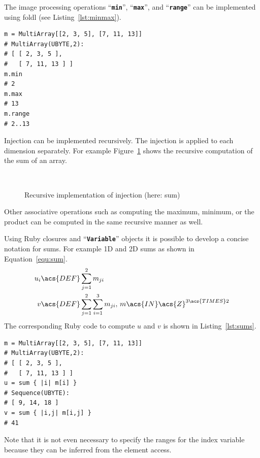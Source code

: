 \documentclass[12pt,a4paper,oneside,openright]{book}
\newcommand{\Eg}{For example }
\newcommand{\equ}[1]{Equation~\ref{equ:#1}}
\newcommand{\fig}[1]{Figure~\ref{fig:#1}}
\newcommand{\lst}[1]{Listing~\ref{lst:#1}}
\newcommand{\code}[1]{``\texttt{\textbf{\textcolor{codegray}{\small{#1}}}}''}
\begin{document}
\begin{CJK}{UTF8}{}
The image processing operations \code{min}, \code{max}, and \code{range} can be implemented using \ac{foldl} (see \lst{minmax}).
\lstset{language=Ruby,frame=single,numbers=none}
\begin{lstlisting}[float=htbp,caption={Various cumulative operations based on injections},escapechar=\$,label=lst:minmax]
m = MultiArray[[2, 3, 5], [7, 11, 13]]
# MultiArray(UBYTE,2):
# [ [ 2, 3, 5 ],
#   [ 7, 11, 13 ] ]
m.min
# 2
m.max
# 13
m.range
# 2..13
\end{lstlisting}
Injection can be implemented recursively. The injection is applied to each dimension separately. \Eg \fig{sum} shows the recursive computation of the sum of an array.
\begin{figure}[htbp]
   \begin{center}
     \\
     \caption{Recursive implementation of injection (here: sum)\label{fig:sum}}
   \end{center}
\end{figure}
Other associative operations such as computing the maximum, minimum, or the product can be computed in the same recursive manner as well.

Using Ruby closures and \code{Variable} objects it is possible to develop a concise notation for sums. \Eg \ac{1D} and \ac{2D} sums as shown in \equ{sum}.
\begin{align}\label{equ:sum}
  \begin{split}
    u_i&\acs{DEF}\displaystyle\sum_{j=1}^2 m_{ji}\\
    v&\acs{DEF}\displaystyle\sum_{j=1}^2\sum_{i=1}^3 m_{ji}\mathrm{,\ }m\acs{IN}\acs{Z}^{3\acs{TIMES} 2}
  \end{split}
\end{align}
The corresponding Ruby code to compute $u$ and $v$ is shown in \lst{sums}.
\lstset{language=Ruby,frame=single,numbers=none}
\begin{lstlisting}[float=htbp,caption={Concise notation for sums of elements},escapechar=\$,label=lst:sums]
m = MultiArray[[2, 3, 5], [7, 11, 13]]
# MultiArray(UBYTE,2):
# [ [ 2, 3, 5 ],
#   [ 7, 11, 13 ] ]
u = sum { |i| m[i] }
# Sequence(UBYTE):
# [ 9, 14, 18 ]
v = sum { |i,j| m[i,j] }
# 41
\end{lstlisting}
Note that it is not even necessary to specify the ranges for the index variable because they can be inferred from the element access.


\end{CJK}
\end{document}

